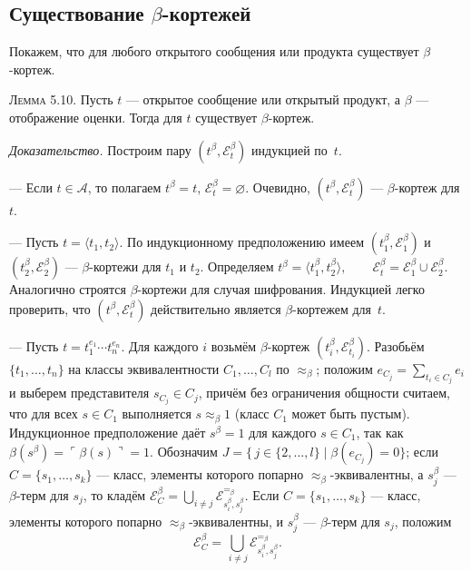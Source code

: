 \subsection{Существование $\beta$-кортежей}

Покажем, что для любого открытого сообщения или продукта
существует $\beta$-кортеж.

\textsc{Лемма 5.10.}\;
Пусть $t$ — открытое сообщение или открытый продукт,
а $\beta$ — отображение оценки.
Тогда для $t$ существует $\beta$-кортеж.

\textit{Доказательство.}
Построим пару \((t^{\beta},\mathcal E^{\beta}_{t})\) индукцией по~$t$.

\medskip
— Если $t \in \mathcal A$, то полагаем $t^{\beta}=t$,
\(\mathcal E^{\beta}_{t}=\varnothing\).
Очевидно, \((t^{\beta},\mathcal E^{\beta}_{t})\) —
$\beta$-кортеж для~$t$.

— Пусть $t=\langle t_{1},t_{2}\rangle$.
По индукционному предположению имеем
\((t_{1}^{\beta},\mathcal E_{1}^{\beta})\)
и \((t_{2}^{\beta},\mathcal E_{2}^{\beta})\)
— $\beta$-кортежи для $t_{1}$ и $t_{2}$.
Определяем
\(
  t^{\beta}=\langle t_{1}^{\beta},t_{2}^{\beta}\rangle,
  \qquad
  \mathcal E^{\beta}_{t}= \mathcal E_{1}^{\beta}\cup\mathcal E_{2}^{\beta}.
\)
Аналогично строятся $\beta$-кортежи для случая шифрования.
Индукцией легко проверить, что $(t^{\beta},\mathcal E^{\beta}_{t})$
действительно является $\beta$-кортежем для~$t$.

— Пусть $t = t_{1}^{e_{1}}\!\cdots t_{n}^{e_{n}}$. Для каждого $i$ возьмём $\beta$-кортеж $(t_{i}^{\beta},\mathcal E_{t_{i}}^{\beta})$. Разобьём $\{t_{1},\dots,t_{n}\}$ на классы эквивалентности $C_{1},\dots,C_{l}$ по $\approx_{\beta}$; положим $e_{C_{j}}=\sum_{t_{i}\in C_{j}}e_{i}$ и выберем представителя $s_{C_{j}}\in C_{j}$, причём без ограничения общности считаем, что для всех $s\in C_{1}$ выполняется $s\approx_{\beta}1$ (класс $C_{1}$ может быть пустым). Индукционное предположение даёт $s^{\beta}=1$ для каждого $s\in C_{1}$, так как $\beta(s^{\beta})=\ulcorner\beta(s)\urcorner=1$. Обозначим $J=\{\,j\in\{2,\dots,l\}\mid\beta(e_{C_{j}})=0\}$; если $C=\{s_{1},\dots,s_{k}\}$ — класс, элементы которого попарно $\approx_{\beta}$-эквивалентны, а $s_{j}^{\beta}$ — $\beta$-терм для $s_{j}$, то кладём $\mathcal E_{C}^{\beta}=\bigcup_{i\ne j}\mathcal E^{=_{\beta}}_{s_{i}^{\beta},s_{j}^{\beta}}$.
Если \(C=\{s_{1},\dots,s_{k}\}\) —
класс, элементы которого попарно
\(\approx_{\beta}\)-эквивалентны,
и \(s_{j}^{\beta}\) — $\beta$-терм для $s_{j}$,
положим
\[
  \mathcal E_{C}^{\beta}=
    \bigcup_{\,i\neq j}
      \mathcal E_{s_{i}^{\beta},s_{j}^{\beta}}^{=_{\beta}}.
\]

